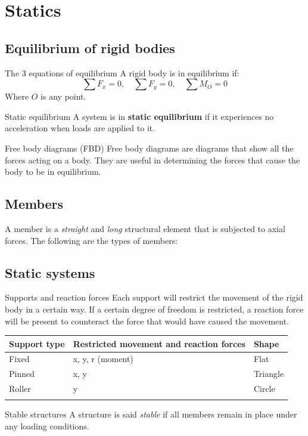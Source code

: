 
\section{Statics}
\subsection{Equilibrium of rigid bodies}
\begin{definition}
    {The 3 equations of equilibrium}
    A rigid body is in equilibrium if:
    \[\sum F_x=0,\quad\sum F_y=0,\quad\sum M_O=0\]
    Where $O$ is any point.
\end{definition}
\begin{definition}
    {Static equilibrium}
    A system is in \textbf{static equilibrium} if it experiences no acceleration when loads are applied to it.
\end{definition}
\begin{knBox}
    {Free body diagrams (FBD)}
    Free body diagrams are diagrams that show all the forces acting on a body. They are useful in determining the forces that cause the body to be in equilibrium.
\end{knBox}

\subsection{Members}
A member is a \emph{straight} and \emph{long} structural element that is subjected to axial forces. The following are the types of members:


\subsection{Static systems}
\begin{definition}
    {Supports and reaction forces}
    Each support will restrict the movement of the rigid body in a certain way. If a certain degree of freedom is restricted, a reaction force will be present to counteract the force that would have caused the movement.
    \begin{table}[H]
        \begin{tabular}{lll}
            \textbf{Support type} & \textbf{Restricted movement and reaction forces} & \textbf{Shape} \\ \hline
            Fixed                 & x, y, r (moment)                                 & Flat           \\ \arrayrulecolor{lightgray}\hline
            Pinned                & x, y                                             & Triangle       \\ \arrayrulecolor{lightgray}\hline
            Roller                & y                                                & Circle         \\ \arrayrulecolor{lightgray}\hline
        \end{tabular}
    \end{table}
\end{definition}
\begin{definition}
    {Stable structures}
    A structure is said \emph{stable} if all members remain in place under any loading conditions.
\end{definition}

